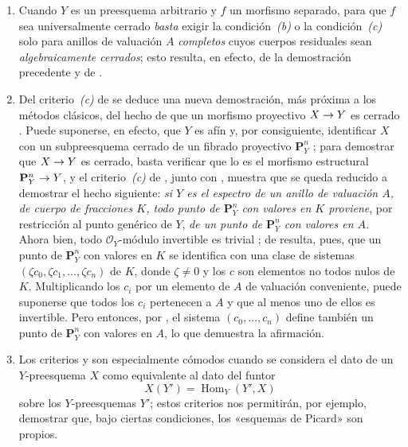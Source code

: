 \documentclass[oneside,10pt]{amsart}
\makeatletter
\newcommand{\ega@arrow}[2]{\mathchoice{#1}{#2}{#2}{#2}}
\renewcommand{\to}{\ega@arrow{\longrightarrow}{\rightarrow}}
\newcommand{\oldpage}[2][]{\marginnote{\normalfont\footnotesize\textbf{#1}~|~#2}\ignorespaces}
\let\EGAOriginalLabel\label
\renewcommand{\label}[1]{\phantomsection\EGAOriginalLabel{#1}}
\makeatother
\begin{document}

\begin{remarks}[7.3.9]
\label{II.7.3.9-fr}
\begin{enumerate}
  \item[\rm{(i)}] Cuando $Y$ es un preesquema arbitrario y $f$ un morfismo separado, para que $f$ sea universalmente cerrado \emph{basta} exigir la condición~\emph{(b)} o la condición~\emph{(c)} solo para anillos de valuación $A$ \emph{completos} cuyos cuerpos residuales sean \emph{algebraicamente cerrados};
  esto resulta, en efecto, de la demostración precedente y de .

  \item[\rm{(ii)}] Del criterio~\emph{(c)} de  se deduce una nueva demostración, más próxima a los métodos clásicos, del hecho de que un morfismo proyectivo $X\to Y$ es cerrado .
  Puede suponerse, en efecto, que $Y$ es afín y, por consiguiente, identificar $X$ con un subpreesquema cerrado de un fibrado proyectivo $\mathbf{P}_Y^n$ ;
  para demostrar que $X\to Y$ es cerrado, basta verificar que lo es el morfismo estructural $\mathbf{P}_Y^n\to Y$, y el criterio~\emph{(c)} de , junto con , muestra que se queda reducido a demostrar el hecho siguiente:
  \emph{si $Y$ es el espectro de un anillo de valuación $A$, de cuerpo de fracciones $K$, todo punto de $\mathbf{P}_Y^n$ con valores en $K$ proviene}, por restricción al punto genérico de $Y$, \emph{de un punto de $\mathbf{P}_Y^n$ con valores en $A$.}
  Ahora bien, todo $\mathcal{O}_Y$-módulo invertible es trivial ;
  de  resulta, pues, que un punto de $\mathbf{P}_Y^n$ con valores en $K$ se identifica con una clase de sistemas
  $(\zeta c_0,\zeta c_1,\ldots,\zeta
c_n)$
  de $K$, donde $\zeta\neq0$ y los $c$ son elementos no todos nulos de $K$.
  Multiplicando los $c_i$ por un elemento de $A$ de
\oldpage[II]{146}
  valuación conveniente, puede suponerse que todos los $c_i$ pertenecen a $A$ y que al menos uno de ellos es invertible.
  Pero entonces, por , el sistema $(c_0,\ldots,c_n)$ define también un punto de $\mathbf{P}_Y^n$ con valores en $A$, lo que demuestra la afirmación.

  \item[\rm{(iii)}] Los criterios  y  son especialmente cómodos cuando se considera el dato de un $Y$-preesquema $X$ como equivalente al dato del funtor
  \[
X(Y')=\operatorname{Hom}_Y(Y',X)
\]
  sobre los $Y$-preesquemas $Y'$;
  estos criterios nos permitirán, por ejemplo, demostrar que, bajo ciertas condiciones, los «esquemas de Picard» son propios.
\end{enumerate}
\end{remarks}
\end{document}
